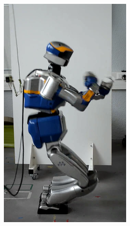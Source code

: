 \begin{figure}
\begin{subfigure}{0.19\columnwidth}
    \includegraphics[width = \columnwidth]
                    {src/chap3-optimal-motion-planning/figure/self-collision-4.png}
    \label{self-collision-4}
  \end{subfigure}
  \begin{subfigure}{0.19\columnwidth}
    \centering

\end{subfigure}
\end{figure}
